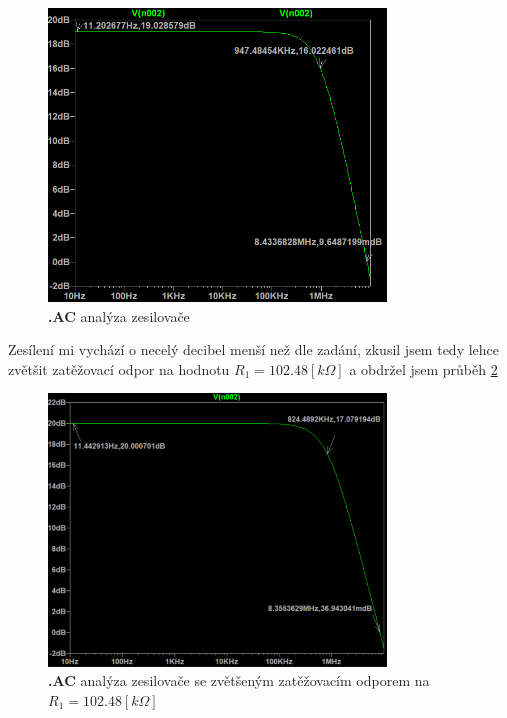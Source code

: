 \vspace{10mm}
\begin{figure}[h!]
    \centering
    \includegraphics[width=0.8\textwidth]{text/img/Res-AC-graf.png}
    \caption{\label{fig:res-AC} {\bf .AC} analýza zesilovače}
\end{figure}
Zesílení mi vychází o necelý decibel menší než dle zadání, zkusil jsem tedy lehce zvětšit zatěžovací odpor na hodnotu \(R_1 = 102.48 [k\Omega]\) a obdržel jsem průběh \ref{fig:res-AC-102.48k}

\begin{figure}[h!]
    \centering
    \includegraphics[width=0.8\textwidth]{text/img/Res-AC-graf-102.48k.png}
    \caption{\label{fig:res-AC-102.48k} {\bf .AC} analýza zesilovače se zvětšeným zatěžovacím odporem na \(R_1 = 102.48 [k\Omega]\)}
\end{figure}

